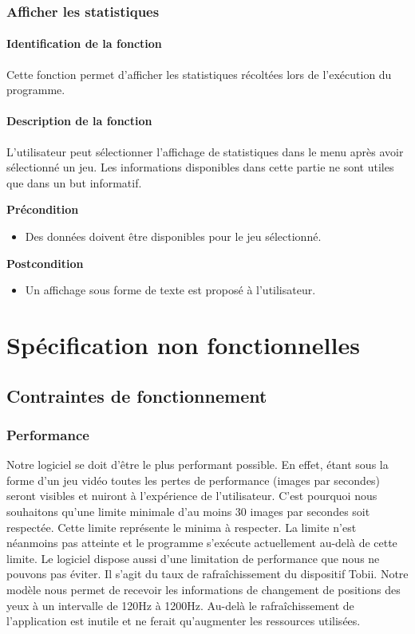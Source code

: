 \documentclass{polytech/polytech}
\begin{document}
\subsubsection{Afficher les statistiques}
\paragraph{Identification de la fonction}
Cette fonction permet d'afficher les statistiques récoltées lors de l'exécution du programme.
\paragraph{Description de la fonction}
L'utilisateur peut sélectionner l'affichage de statistiques dans le menu après avoir sélectionné un jeu. Les informations disponibles dans cette partie ne sont utiles que dans un but informatif. 

\textbf{Précondition}
\begin{itemize}
\item Des données doivent être disponibles pour le jeu sélectionné.
\end{itemize}

\textbf{Postcondition}
\begin{itemize}
\item Un affichage sous forme de texte est proposé à l'utilisateur.
\end{itemize}


\section{Spécification non fonctionnelles}
\subsection{Contraintes de fonctionnement}
\subsubsection{Performance}
Notre logiciel se doit d'être le plus performant possible. En effet, étant sous la forme d'un jeu vidéo toutes les pertes de performance (images par secondes) seront visibles et nuiront à l'expérience de l'utilisateur. C'est pourquoi nous souhaitons qu'une limite minimale d'au moins 30 images par secondes soit respectée. Cette limite représente le minima à respecter. La limite n'est néanmoins pas atteinte et le programme s'exécute actuellement au-delà de cette limite.
Le logiciel dispose aussi d'une limitation de performance que nous ne pouvons pas éviter. Il s'agit du taux de rafraîchissement du dispositif Tobii. Notre modèle nous permet de recevoir les informations de changement de positions des yeux à un intervalle de 120Hz à 1200Hz. Au-delà le rafraîchissement de l'application est inutile et ne ferait qu'augmenter les ressources utilisées.
\end{document}
